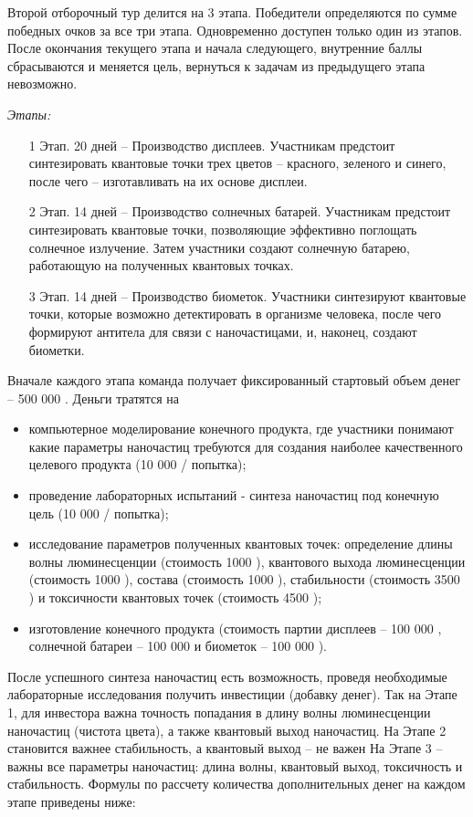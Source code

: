 Второй отборочный тур делится на 3 этапа. Победители определяются по сумме победных очков за все три этапа. Одновременно доступен только один из этапов. После окончания текущего этапа и начала следующего, внутренние баллы сбрасываются и меняется цель, вернуться к задачам из предыдущего этапа невозможно.

\textit{Этапы:}
\begin{enumerate}
    \item[1 Этап.] 20 дней – Производство дисплеев. Участникам предстоит синтезировать квантовые точки трех цветов – красного, зеленого и синего, после чего – изготавливать на их основе дисплеи.
    \item[2 Этап.] 14 дней – Производство солнечных батарей. Участникам предстоит синтезировать квантовые точки, позволяющие эффективно поглощать солнечное излучение. Затем участники создают солнечную батарею, работающую на полученных квантовых точках.
    \item[3 Этап.] 14 дней – Производство биометок. Участники синтезируют квантовые точки, которые возможно детектировать в организме человека, после чего формируют антитела для связи с наночастицами, и, наконец, создают биометки.
\end{enumerate}

Вначале каждого этапа команда получает фиксированный стартовый объем денег – 500 000 \textpeso. Деньги тратятся на
\begin{itemize}
    \item компьютерное моделирование конечного продукта, где участники понимают какие параметры наночастиц требуются для создания наиболее качественного целевого продукта (10 000 \textpeso / попытка);
    \item проведение лабораторных испытаний - синтеза наночастиц под конечную цель (10 000 \textpeso / попытка);
    \item исследование параметров полученных квантовых точек: определение длины волны люминесценции (стоимость 1000 \textpeso), квантового выхода люминесценции (стоимость 1000 \textpeso), состава (стоимость 1000 \textpeso), стабильности (стоимость 3500 \textpeso) и токсичности квантовых точек (стоимость 4500 \textpeso);
    \item изготовление конечного продукта (стоимость партии дисплеев – 100 000 \textpeso, солнечной батареи – 100 000 \textpeso и биометок – 100 000 \textpeso).
\end{itemize}

После успешного синтеза наночастиц есть возможность, проведя необходимые лабораторные исследования получить инвестиции (добавку денег). Так на Этапе 1, для инвестора важна точность попадания в длину волны люминесценции наночастиц (чистота цвета), а также квантовый выход наночастиц. На Этапе 2 становится важнее стабильность, а квантовый выход – не важен На Этапе 3 – важны все параметры наночастиц: длина волны, квантовый выход, токсичность и стабильность. Формулы по рассчету количества дополнительных денег на каждом этапе приведены ниже:

